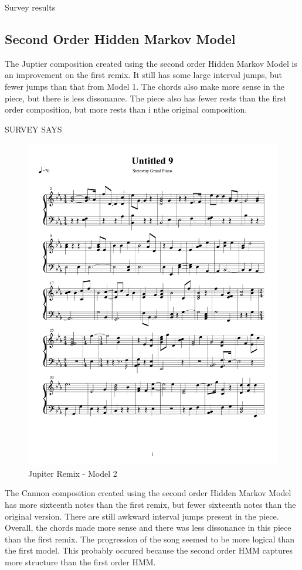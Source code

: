 \documentclass{article} %
\begin{document}
Survey results

\subsection{Second Order Hidden Markov Model}

The Juptier composition created using the second order Hidden Markov Model is an improvement on the first remix. It still has some large interval jumps, but fewer jumps than that from Model 1. The chords also make more sense in the piece, but there is less dissonance. The piece also has fewer rests than the first order composition, but more rests than i nthe original composition.

SURVEY SAYS


\begin{figure}[H]
\centering
\caption{Jupiter Remix - Model 2}
\includegraphics [scale = 0.6] {JupiterRemix2-cropped.pdf}
\end{figure}

The Cannon composition created using the second order Hidden Markov Model has more sixteenth notes than the first remix, but fewer sixteenth notes than the original version. There are still awkward interval jumps present in the piece. Overall, the chords made more sense and there was less dissonance in this piece than the first remix. The progression of the song seemed to be more logical than the first model. This probably occured because the second order HMM captures more structure than the first order HMM.
\end{document}
